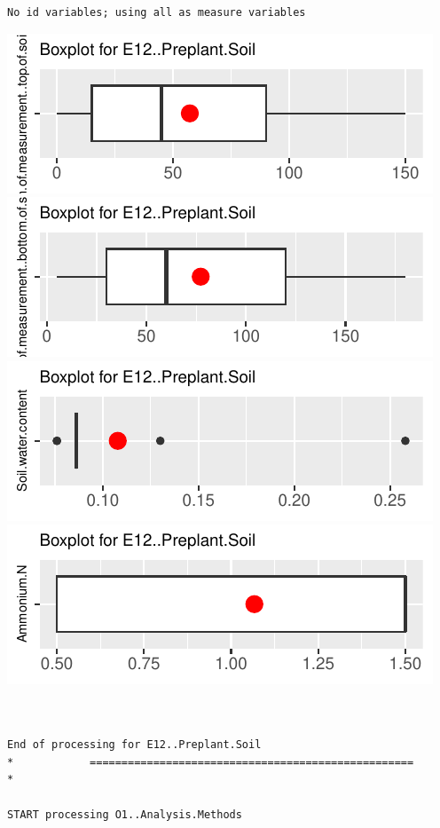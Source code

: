 \documentclass[
]{article}
\begin{document}
\begin{verbatim}
No id variables; using all as measure variables
\end{verbatim}

\includegraphics{FL_Crop_BMP_QA_single_dataset_files/figure-latex/check-content-of-sheets-15.pdf}
\includegraphics{FL_Crop_BMP_QA_single_dataset_files/figure-latex/check-content-of-sheets-16.pdf}
\includegraphics{FL_Crop_BMP_QA_single_dataset_files/figure-latex/check-content-of-sheets-17.pdf}
\includegraphics{FL_Crop_BMP_QA_single_dataset_files/figure-latex/check-content-of-sheets-18.pdf}

\begin{verbatim}


End of processing for E12..Preplant.Soil
*            ===================================================            *

START processing O1..Analysis.Methods
\end{verbatim}
\end{document}
